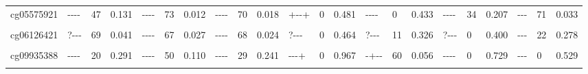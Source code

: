 \documentclass[11pt,twoside]{bristolthesis}
\begin{document}
\begin{landscape}
\begin{table}[!h]
{\begin{tabular}[t]{llllllllllllllllllllll}
cg05575921 & {-}{-}{-}{-} & 47 & 0.131 & {-}{-}{-}{-} & 73 & 0.012 & {-}{-}{-}{-} & 70 & 0.018 & {+}{-}{-}{+} & 0 & 0.481 & {-}{-}{-}{-} & 0 & 0.433 & {-}{-}{-}{-} & 34 & 0.207 & {-}{-}{-} & 71 & 0.033\\
\cellcolor{gray!6}{cg05951221} & \cellcolor{gray!6}{{-}{-}{-}{-}} & \cellcolor{gray!6}{45} & \cellcolor{gray!6}{0.139} & \cellcolor{gray!6}{{-}{-}{-}{-}} & \cellcolor{gray!6}{61} & \cellcolor{gray!6}{0.053} & \cellcolor{gray!6}{{-}{-}{-}{-}} & \cellcolor{gray!6}{54} & \cellcolor{gray!6}{0.092} & \cellcolor{gray!6}{{-}{-}{+}{+}} & \cellcolor{gray!6}{0} & \cellcolor{gray!6}{0.862} & \cellcolor{gray!6}{{-}{-}{-}{-}} & \cellcolor{gray!6}{33} & \cellcolor{gray!6}{0.217} & \cellcolor{gray!6}{{-}{-}{-}{-}} & \cellcolor{gray!6}{15} & \cellcolor{gray!6}{0.315} & \cellcolor{gray!6}{{-}{-}{-}} & \cellcolor{gray!6}{44} & \cellcolor{gray!6}{0.168}\\
\addlinespace
cg06126421 & {?}{-}{-}{-} & 69 & 0.041 & {-}{-}{-}{-} & 67 & 0.027 & {-}{-}{-}{-} & 68 & 0.024 & {?}{-}{-}{-} & 0 & 0.464 & {?}{-}{-}{-} & 11 & 0.326 & {?}{-}{-}{-} & 0 & 0.400 & {-}{-}{-} & 22 & 0.278\\
\cellcolor{gray!6}{cg08709672} & \cellcolor{gray!6}{{-}{-}{-}{-}} & \cellcolor{gray!6}{12} & \cellcolor{gray!6}{0.333} & \cellcolor{gray!6}{{-}{-}{-}{-}} & \cellcolor{gray!6}{52} & \cellcolor{gray!6}{0.101} & \cellcolor{gray!6}{{-}{-}{-}{-}} & \cellcolor{gray!6}{57} & \cellcolor{gray!6}{0.071} & \cellcolor{gray!6}{{-}{-}{+}{+}} & \cellcolor{gray!6}{55} & \cellcolor{gray!6}{0.085} & \cellcolor{gray!6}{{-}{-}{-}{+}} & \cellcolor{gray!6}{0} & \cellcolor{gray!6}{0.584} & \cellcolor{gray!6}{{-}{-}{-}{+}} & \cellcolor{gray!6}{0} & \cellcolor{gray!6}{0.735} & \cellcolor{gray!6}{{-}{-}{-}} & \cellcolor{gray!6}{0} & \cellcolor{gray!6}{0.657}\\
cg09935388 & {-}{-}{-}{-} & 20 & 0.291 & {-}{-}{-}{-} & 50 & 0.110 & {-}{-}{-}{-} & 29 & 0.241 & {-}{-}{-}{+} & 0 & 0.967 & {-}{+}{-}{-} & 60 & 0.056 & {-}{-}{-}{-} & 0 & 0.729 & {-}{-}{-} & 0 & 0.529\\
\cellcolor{gray!6}{cg11660018} & \cellcolor{gray!6}{{-}{-}{-}{-}} & \cellcolor{gray!6}{0} & \cellcolor{gray!6}{0.476} & \cellcolor{gray!6}{{-}{-}{-}{-}} & \cellcolor{gray!6}{7} & \cellcolor{gray!6}{0.358} & \cellcolor{gray!6}{{-}{-}{-}{-}} & \cellcolor{gray!6}{0} & \cellcolor{gray!6}{0.455} & \cellcolor{gray!6}{{+}{-}{+}{+}} & \cellcolor{gray!6}{0} & \cellcolor{gray!6}{0.699} & \cellcolor{gray!6}{{-}{-}{-}{-}} & \cellcolor{gray!6}{9} & \cellcolor{gray!6}{0.349} & \cellcolor{gray!6}{{-}{-}{-}{-}} & \cellcolor{gray!6}{0} & \cellcolor{gray!6}{0.557} & \cellcolor{gray!6}{{-}{-}{-}} & \cellcolor{gray!6}{16} & \cellcolor{gray!6}{0.305}\\

\end{tabular}}
\end{table}
\end{landscape}
\end{document}
